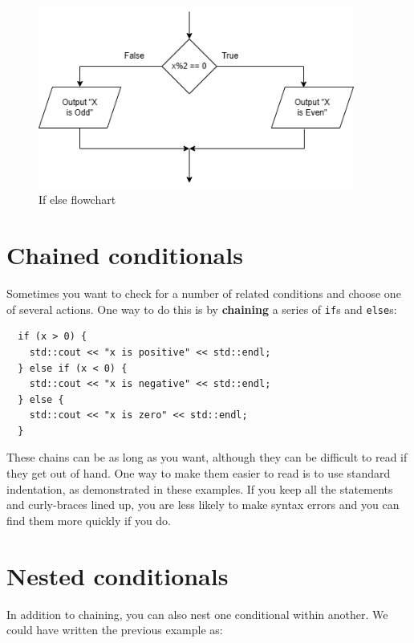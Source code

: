 \begin{figure}[h]
    \centering
    \includegraphics[height=6cm]{images/ifelseflow.png}
    \caption{If else flowchart}
    \label{fig:ifelseflow}
\end{figure}


\section {Chained conditionals}

Sometimes you want to check for a number of related conditions
and choose one of several actions.  One way to do this is by
{\bf chaining} a series of {\tt if}s and {\tt else}s:

\begin{lstlisting}
  if (x > 0) {
    std::cout << "x is positive" << std::endl;
  } else if (x < 0) {
    std::cout << "x is negative" << std::endl;
  } else {
    std::cout << "x is zero" << std::endl;
  }
\end{lstlisting}
%
These chains can be as long as you want, although they can
be difficult to read if they get out of hand.  One way to
make them easier to read is to use standard indentation,
as demonstrated in these examples.  If you keep all the
statements and curly-braces lined up, you are less
likely to make syntax errors and you can find them more
quickly if you do.

\section{Nested conditionals}

In addition to chaining, you can also nest one conditional
within another.  We could have written the previous example
as:

